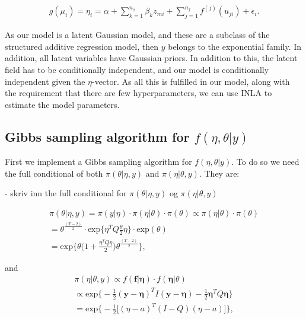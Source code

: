 \begin{equation} 
\begin{split}
    g(\mu_i) = \eta_i = \alpha + \sum_{k = 1}^{n_\beta} \beta_k z_{mi} + \sum_{j = 1}^{n_f}f^{(j)}(u_{ji}) + \epsilon_i.
\end{split}
\end{equation}

As our model is a latent Gaussian model, and these are a subclass of the structured additive regression model, then $y$ belongs to the exponential family. In addition, all latent variables have Gaussian priors. In addition to this, the latent field has to be conditionally independent, and our model is conditionally independent given the $\eta$-vector. As all this is fulfilled in our model, along with the requirement that there are few hyperparameters, we can use INLA to estimate the model parameters. 




\subsection{Gibbs sampling algorithm for $f(\eta, \theta |y)$}
\label{Gibbs}

First we implement a Gibbs sampling algorithm for $f(\eta, \theta |y)$. To do so we need the full conditional of both $\pi(\theta|\eta, y)$ and $\pi(\eta|\theta, y)$. They are:

- skriv inn the full conditional for $\pi(\theta|\eta, y)$ og $\pi(\eta|\theta, y)$

\begin{align}
    \pi(\theta| \eta, y) = \pi(y|\eta) \cdot \pi(\eta|\theta) \cdot \pi(\theta) \propto \pi(\eta|\theta) \cdot \pi(\theta) \nonumber \\
    = \theta^{\frac{(T-2)}{2}} \cdot \text{exp} \Big\{ \eta^T Q \frac{\theta}{2} \eta \Big\} \cdot \text{exp}(\theta) \nonumber \\
    = \text{exp} \Big\{  \theta \big(1 + \frac{\eta^T Q \eta}{2}  \big) \theta^{\frac{(T-2)}{2}}  \Big\}, 
\end{align}

and 
\begin{align}
    \pi(\eta | \theta, y) \propto f(\mathbf{f}|\mathbf{\eta}) \cdot f(\mathbf{\eta}|\theta) \nonumber \\
    \propto \text{exp} \Bigg\{ -\frac{1}{2}(\mathbf{y} - \mathbf{\eta})^T I (\mathbf{y}-\mathbf{\eta}) - \frac{1}{2} \mathbf{\eta}^T Q \mathbf{\eta} \Bigg\} \nonumber \\
    = \text{exp} \Bigg\{  -\frac{1}{2} \Big[ (\eta - a)^T (I - Q) (\eta - a) \Big] \Bigg\}, 
\end{align}

